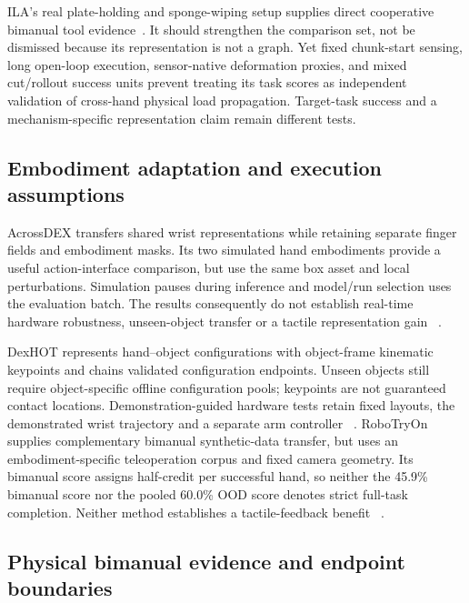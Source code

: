 ILA's real plate-holding and sponge-wiping setup supplies direct cooperative
bimanual tool evidence~\cite{zheng2026ila}. It should strengthen the comparison
set, not be dismissed because its representation is not a graph. Yet fixed
chunk-start sensing, long open-loop execution, sensor-native deformation
proxies, and mixed cut/rollout success units prevent treating its task scores as
independent validation of cross-hand physical load propagation. Target-task
success and a mechanism-specific representation claim remain different tests.


\subsection{Embodiment adaptation and execution assumptions}

AcrossDEX transfers shared wrist representations while retaining separate
finger fields and embodiment masks. Its two simulated hand embodiments provide
a useful action-interface comparison, but use the same box asset and local
perturbations. Simulation pauses during inference and model/run selection uses
the evaluation batch. The results consequently do not establish real-time
hardware robustness, unseen-object transfer or a tactile representation gain
~\cite{nov2026acrossdex}.

DexHOT represents hand--object configurations with object-frame kinematic
keypoints and chains validated configuration endpoints. Unseen objects still require
object-specific offline configuration pools; keypoints are not guaranteed
contact locations. Demonstration-guided hardware tests retain fixed layouts,
the demonstrated wrist trajectory and a separate arm controller
~\cite{nov2026dexhot}. RoboTryOn supplies complementary bimanual synthetic-data
transfer, but uses an embodiment-specific teleoperation corpus and fixed camera
geometry. Its bimanual score assigns half-credit per successful hand, so neither
the 45.9\% bimanual score nor the pooled 60.0\% OOD score denotes strict full-task
completion. Neither method establishes a tactile-feedback benefit
~\cite{nov2026robotryon}.

\subsection{Physical bimanual evidence and endpoint boundaries}

